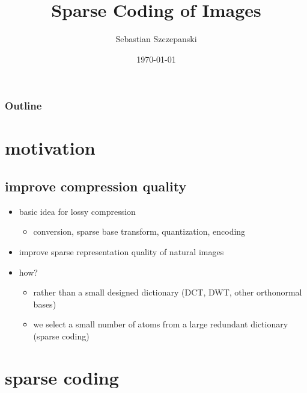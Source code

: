 




\title{Sparse Coding of Images}
\author{Sebastian Szczepanski}
\date{\today}

\begin{frame}
\titlepage
\end{frame}

\begin{frame}
\frametitle{Outline}
\tableofcontents %
\end{frame}


\section{motivation}
\subsection{improve compression quality}
\begin{frame}
\begin{itemize}
\item basic idea for lossy compression
	\begin{itemize}
	\item  conversion, sparse base transform, quantization, encoding
	\end{itemize}
\pause
\item improve sparse representation quality of natural images 
\pause
\item how?
\pause
	\begin{itemize}
	\item rather than a small designed dictionary (DCT, DWT, other orthonormal bases)	
	\pause
	\item we select a small number of atoms from a large redundant dictionary (sparse coding)
	\end{itemize}
\end{itemize}
\end{frame}

\section{sparse coding}



